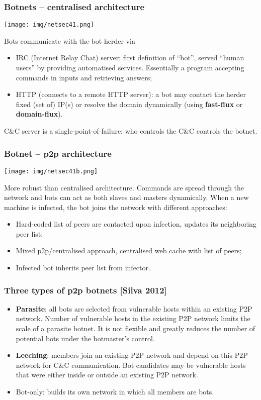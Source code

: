 \documentclass[a4paper, 10pt, titlepage]{article}
\begin{document}
\subsubsection*{Botnets – centralised architecture}
\begin{center}
	\texttt{[image: img/netsec41.png]}
\end{center}
Bots communicate with the bot herder via
\begin{itemize}
	\item IRC (Internet Relay Chat) server: first definition of “bot”, served “human users” by providing automatised services. Essentially a program accepting commands in inputs and retrieving answers;
	\item HTTP (connects to a remote HTTP server): a bot may contact the herder fixed (set of) IP(s) or resolve the domain dynamically (using \textbf{fast-flux} or \textbf{domain-flux}).
\end{itemize}
C\&C server is a single-point-of-failure: who controls the C\&C controls the botnet.

\subsubsection*{Botnet – p2p architecture}
\begin{center}
	\texttt{[image: img/netsec41b.png]}
\end{center}
More robust than centralised architecture. Commands are spread through the network and bots can act as both slaves and masters dynamically. When a new machine is infected, the bot joins the network with different approaches:
\begin{itemize}
	\item Hard-coded list of peers are contacted upon infection, updates its neighboring peer list;
	\item Mixed p2p/centralised approach, centralised web cache with list of peers;
	\item Infected bot inherits peer list from infector.
\end{itemize}

\subsubsection*{Three types of p2p botnets [Silva 2012]}
\begin{itemize}
	\item \textbf{Parasite}: all bots are selected from vulnerable hosts within an existing P2P network. Number of vulnerable hosts in the existing P2P network limits the scale of a parasite botnet. It is not flexible and greatly reduces the number of potential bots under the botmaster’s control.
	\item \textbf{Leeching}: members join an existing P2P network and depend on this P2P network for C\&C communication. Bot candidates may be vulnerable hosts that were either inside or outside an existing P2P network.
	\item Bot-only: builds its own network in which all members are bots.
\end{itemize}
\end{document}
